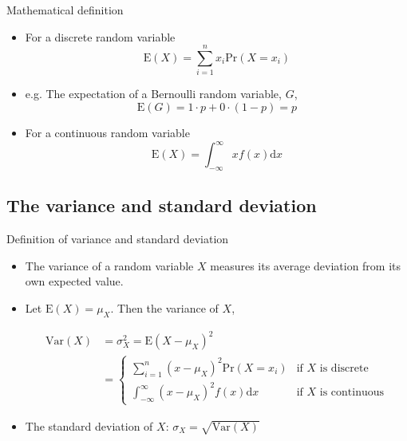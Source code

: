\documentclass[presentation]{beamer}
\begin{document}
\begin{frame}[label={sec:orgb1b651d}]{Mathematical definition}
\begin{itemize}
\item For a discrete random variable
\[ \mathrm{E}(X) = \sum_{i=1}^n x_i \mathrm{Pr}(X = x_i) \]

\item e.g. The expectation of a Bernoulli random variable, \(G\),
\[ \mathrm{E}(G) = 1 \cdot p + 0 \cdot (1-p) = p \]

\item For a continuous random variable
\[ \mathrm{E}(X) = \int_{-\infty}^{\infty} x f(x) \mathrm{d}x\]
\end{itemize}
\end{frame}

\subsection*{The variance and standard deviation}
\label{sec:org847377e}

\begin{frame}[label={sec:orgcd0b0fe}]{Definition of variance and standard deviation}
\begin{itemize}
\item The \alert{variance} of a random variable \(X\) measures its average
deviation from its own expected value.

\item Let \(\mathrm{E}(X) = \mu_X\). Then the variance of \(X\),

\begin{align*}
\mathrm{Var}(X) & =  \sigma^2_X =  \mathrm{E}(X-\mu_X)^{2} \\
& = 
\begin{cases}
\sum_{i=1}^n (x - \mu_X)^{2}\mathrm{Pr}(X = x_i) & \text{if } X \text{ is discrete} \\
\int_{-\infty}^{\infty} (x - \mu_X)^{2}f(x)\mathrm{d} x  & \text{if } X \text{ is continuous}
\end{cases}
\end{align*}

\item The \alert{standard deviation} of \(X\): \(\sigma_{X} = \sqrt{\mathrm{Var}(X)}\)
\end{itemize}
\end{frame}
\end{document}
